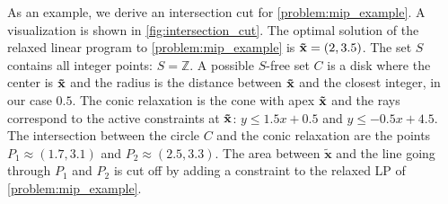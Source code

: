 As an example, we derive an intersection cut for \cref{problem:mip_example}. A visualization is shown in \cref{fig:intersection_cut}. 
The optimal solution of the relaxed linear program to \cref{problem:mip_example} is $\bold{\tilde x} = (2, 3.5)$. The set $S$ contains all integer points: $S = \mathbb{Z}$. A possible $S$-free set $C$ is a disk where the center is $\bold{\tilde x}$ and the radius is the distance between $\bold{\tilde x}$ and the closest integer, in our case $0.5$. 
The conic relaxation is the cone with apex $\bold{\tilde x}$ and the rays correspond to the active constraints at $\bold{\tilde x}$: $y \leq 1.5x + 0.5$ and $y \leq -0.5 x + 4.5$. 
The intersection between the circle $C$ and the conic relaxation are the points $P_1 \approx (1.7,3.1)$ and $P_2 \approx (2.5,3.3)$. The area between $\boldsymbol{\tilde x}$ and the line going through $P_1$ and $P_2$ is cut off by adding a constraint to the relaxed LP of \cref{problem:mip_example}. 

